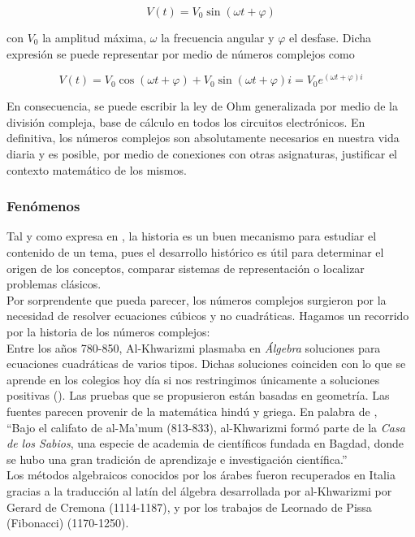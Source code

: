 \documentclass[../main.tex]{memoir}
\begin{document}
$$V(t) = V_0  \sin(\omega t + \varphi)$$

con $V_0$ la amplitud máxima, $\omega$ la frecuencia angular y $\varphi$ el desfase. Dicha expresión se puede representar por medio de números complejos como

$$V(t) = V_0 \cos(\omega t +\varphi) + V_0 \sin(\omega t + \varphi) i = V_0 e^{(\omega t + \varphi)i}$$

En consecuencia, se puede escribir la ley de Ohm generalizada por medio de la división compleja, base de cálculo en todos los circuitos electrónicos. En definitiva, los números complejos son absolutamente necesarios en nuestra vida diaria y es posible, por medio de conexiones con otras asignaturas, justificar el contexto matemático de los mismos.
\subsubsection{Fenómenos}

Tal y como expresa \cite{lupi2013} en \cite{rico2013}, la historia es un buen mecanismo para estudiar el contenido de un tema, pues el desarrollo histórico es útil para determinar el origen de los conceptos, comparar sistemas de representación o localizar problemas clásicos. \\

Por sorprendente que pueda parecer, los números complejos surgieron por la necesidad de resolver ecuaciones cúbicos y no cuadráticas. Hagamos un recorrido por la historia de los números complejos: \\

Entre los años 780-850, Al-Khwarizmi plasmaba en \textit{Álgebra} soluciones para ecuaciones cuadráticas de varios tipos. Dichas soluciones coinciden con lo que se aprende en los colegios hoy día si nos restringimos únicamente a soluciones positivas (\cite{waerden1985}). Las pruebas que se propusieron están basadas en geometría. Las fuentes parecen provenir de la matemática hindú y griega. En palabra de \cite{waerden1985}, \\

``Bajo el califato de al-Ma'mum (813-833), al-Khwarizmi formó parte de la \textit{Casa de los Sabios}, una especie de academia de científicos fundada en Bagdad, donde se hubo una gran tradición de aprendizaje e investigación científica.'' \\

Los métodos algebraicos conocidos por los árabes fueron recuperados en Italia gracias a la traducción al latín del álgebra desarrollada por al-Khwarizmi por Gerard de Cremona (1114-1187), y por los trabajos de Leornado de Pissa (Fibonacci) (1170-1250). \\
\end{document}
